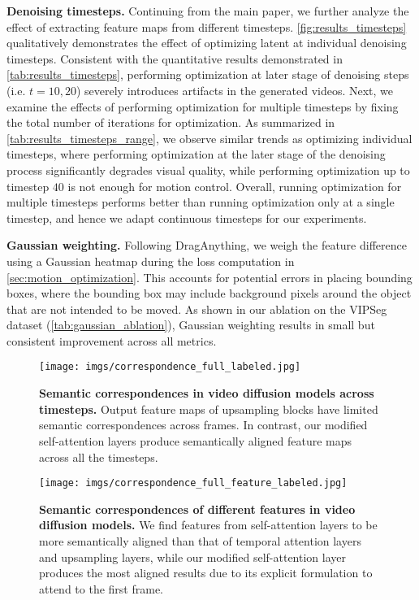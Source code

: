 \documentclass{article} \usepackage{iclr2025_conference,times}
\begin{document}
\textbf{Denoising timesteps.} 
Continuing from the main paper, we further analyze the effect of extracting feature maps from different timesteps.
\cref{fig:results_timesteps} qualitatively demonstrates the effect of optimizing latent at individual denoising timesteps.  
Consistent with the quantitative results demonstrated in \cref{tab:results_timesteps}, performing optimization at later stage of denoising steps (i.e. $t=10, 20$) severely introduces artifacts in the generated videos.
Next, we examine the effects of performing optimization for multiple timesteps by fixing the total number of iterations for optimization.
As summarized in \cref{tab:results_timesteps_range}, we observe similar trends as optimizing individual timesteps, where performing optimization at the later stage of the denoising process significantly degrades visual quality, while performing optimization up to timestep $40$ is not enough for motion control. 
Overall, running optimization for multiple timesteps performs better than running optimization only at a single timestep, and hence we adapt continuous timesteps for our experiments. 

\textbf{Gaussian weighting.} Following DragAnything, we weigh the feature difference using a Gaussian heatmap during the loss computation in \cref{sec:motion_optimization}. This accounts for potential errors in placing bounding boxes, where the bounding box may include background pixels around the object that are not intended to be moved. As shown in our ablation on the VIPSeg dataset (\cref{tab:gaussian_ablation}), Gaussian weighting results in small but consistent improvement across all metrics.

\begin{figure}[!t]
\centering
\texttt{[image: imgs/correspondence\_full\_labeled.jpg]}
\caption{\textbf{Semantic correspondences in video diffusion models across timesteps.}
Output feature maps of upsampling blocks have limited semantic correspondences across frames.
In contrast, our modified self-attention layers produce semantically aligned feature maps across all the timesteps.
}
\label{fig:correspondence_full}
\end{figure}


\begin{figure}[!t]
\centering
\texttt{[image: imgs/correspondence\_full\_feature\_labeled.jpg]}
\caption{\textbf{Semantic correspondences of different features in video diffusion models.}
We find features from self-attention layers to be more semantically aligned than that of temporal attention layers and upsampling layers, while our modified self-attention layer produces the most aligned results due to its explicit formulation to attend to the first frame.
}
\label{fig:correspondence_full_feature}
\end{figure}
\end{document}
